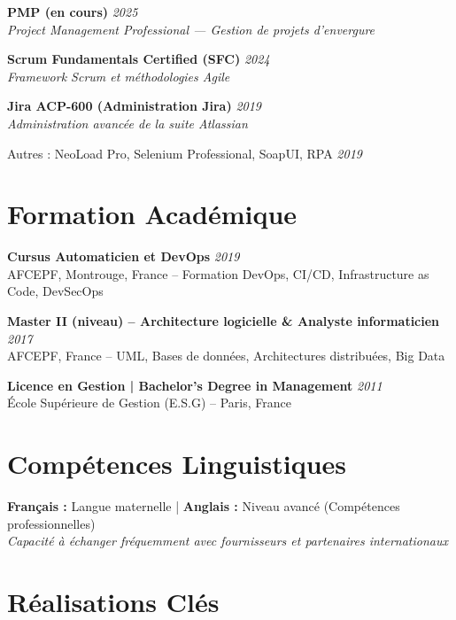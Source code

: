 \documentclass[11pt,a4paper]{article}
\begin{document}
\textbf{PMP (en cours)} \hfill \textit{\color{mediumgray}2025}\\
\textit{Project Management Professional — Gestion de projets d'envergure}

\textbf{Scrum Fundamentals Certified (SFC)} \hfill \textit{\color{mediumgray}2024}\\
\textit{Framework Scrum et méthodologies Agile}

\textbf{Jira ACP-600 (Administration Jira)} \hfill \textit{\color{mediumgray}2019}\\
\textit{Administration avancée de la suite Atlassian}

Autres : NeoLoad Pro, Selenium Professional, SoapUI, RPA \hfill \textit{\color{mediumgray}2019}

\section*{Formation Académique}

\textbf{Cursus Automaticien et DevOps} \hfill \textit{\color{mediumgray}2019}\\
AFCEPF, Montrouge, France -- Formation DevOps, CI/CD, Infrastructure as Code, DevSecOps

\textbf{Master II (niveau) -- Architecture logicielle \& Analyste informaticien} \hfill \textit{\color{mediumgray}2017}\\
AFCEPF, France -- UML, Bases de données, Architectures distribuées, Big Data

\textbf{Licence en Gestion | Bachelor's Degree in Management} \hfill \textit{\color{mediumgray}2011}\\
École Supérieure de Gestion (E.S.G) -- Paris, France

\vspace{6pt}

\section*{Compétences Linguistiques}

\textbf{Français :} Langue maternelle \quad | \quad \textbf{Anglais :} Niveau avancé (Compétences professionnelles)\\
\textit{Capacité à échanger fréquemment avec fournisseurs et partenaires internationaux}

\vspace{6pt}

\section*{Réalisations Clés}
\end{document}
